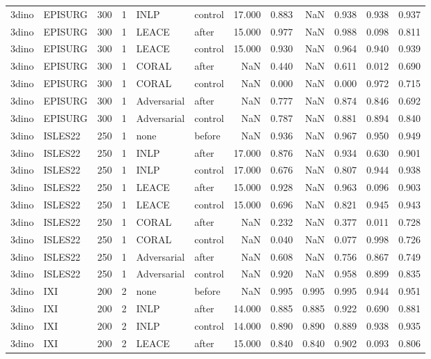 \begin{tabular}{llrrllrrrrrr}
3dino & EPISURG & 300 & 1 & INLP & control & 17.000 & 0.883 & NaN & 0.938 & 0.938 & 0.937 \\
3dino & EPISURG & 300 & 1 & LEACE & after & 15.000 & 0.977 & NaN & 0.988 & 0.098 & 0.811 \\
3dino & EPISURG & 300 & 1 & LEACE & control & 15.000 & 0.930 & NaN & 0.964 & 0.940 & 0.939 \\
3dino & EPISURG & 300 & 1 & CORAL & after & NaN & 0.440 & NaN & 0.611 & 0.012 & 0.690 \\
3dino & EPISURG & 300 & 1 & CORAL & control & NaN & 0.000 & NaN & 0.000 & 0.972 & 0.715 \\
3dino & EPISURG & 300 & 1 & Adversarial & after & NaN & 0.777 & NaN & 0.874 & 0.846 & 0.692 \\
3dino & EPISURG & 300 & 1 & Adversarial & control & NaN & 0.787 & NaN & 0.881 & 0.894 & 0.840 \\
3dino & ISLES22 & 250 & 1 & none & before & NaN & 0.936 & NaN & 0.967 & 0.950 & 0.949 \\
3dino & ISLES22 & 250 & 1 & INLP & after & 17.000 & 0.876 & NaN & 0.934 & 0.630 & 0.901 \\
3dino & ISLES22 & 250 & 1 & INLP & control & 17.000 & 0.676 & NaN & 0.807 & 0.944 & 0.938 \\
3dino & ISLES22 & 250 & 1 & LEACE & after & 15.000 & 0.928 & NaN & 0.963 & 0.096 & 0.903 \\
3dino & ISLES22 & 250 & 1 & LEACE & control & 15.000 & 0.696 & NaN & 0.821 & 0.945 & 0.943 \\
3dino & ISLES22 & 250 & 1 & CORAL & after & NaN & 0.232 & NaN & 0.377 & 0.011 & 0.728 \\
3dino & ISLES22 & 250 & 1 & CORAL & control & NaN & 0.040 & NaN & 0.077 & 0.998 & 0.726 \\
3dino & ISLES22 & 250 & 1 & Adversarial & after & NaN & 0.608 & NaN & 0.756 & 0.867 & 0.749 \\
3dino & ISLES22 & 250 & 1 & Adversarial & control & NaN & 0.920 & NaN & 0.958 & 0.899 & 0.835 \\
3dino & IXI & 200 & 2 & none & before & NaN & 0.995 & 0.995 & 0.995 & 0.944 & 0.951 \\
3dino & IXI & 200 & 2 & INLP & after & 14.000 & 0.885 & 0.885 & 0.922 & 0.690 & 0.881 \\
3dino & IXI & 200 & 2 & INLP & control & 14.000 & 0.890 & 0.890 & 0.889 & 0.938 & 0.935 \\
3dino & IXI & 200 & 2 & LEACE & after & 15.000 & 0.840 & 0.840 & 0.902 & 0.093 & 0.806 \\

\end{tabular}

